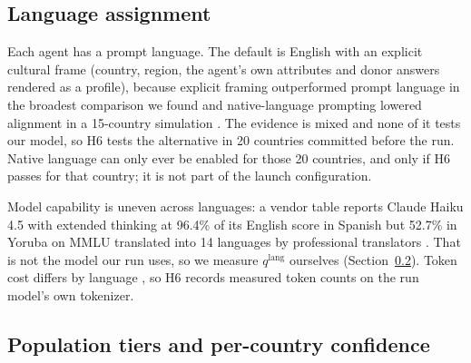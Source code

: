 \documentclass[10pt]{article}
\begin{document}
\subsection{Language assignment}
\label{sec:lang}

Each agent has a prompt language. The default is English with an explicit cultural frame (country, region, the agent's own attributes and donor answers rendered as a profile), because explicit framing outperformed prompt language in the broadest comparison we found \citep{bulte2026} and native-language prompting lowered alignment in a 15-country simulation \citep{kwok2024}. The evidence is mixed \citep{alkhamissi2024,liu2025} and none of it tests our model, so H6 tests the alternative in 20 countries committed before the run. Native language can only ever be enabled for those 20 countries, and only if H6 passes for that country; it is not part of the launch configuration.

Model capability is uneven across languages: a vendor table reports Claude Haiku 4.5 with extended thinking at 96.4\% of its English score in Spanish but 52.7\% in Yoruba on MMLU translated into 14 languages by professional translators \citep{anthropicmultilingual}. That is not the model our run uses, so we measure $q^{\text{lang}}$ ourselves (Section~\ref{sec:tiers}). Token cost differs by language \citep{petrov2023,ahia2023}, so H6 records measured token counts on the run model's own tokenizer.

\subsection{Population tiers and per-country confidence}
\label{sec:tiers}
\end{document}
